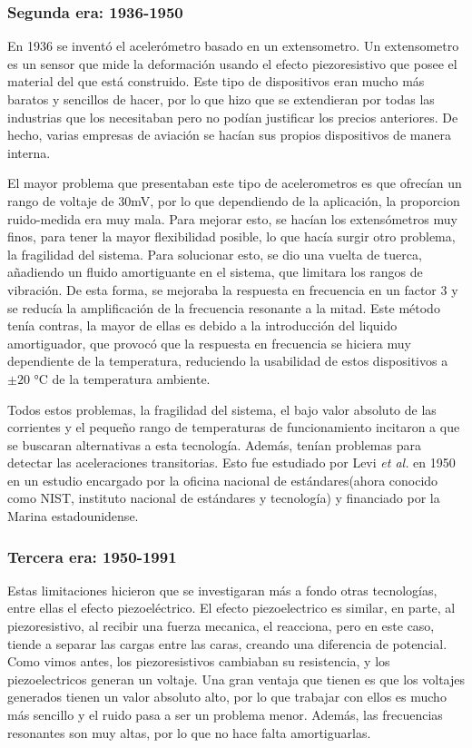 \documentclass[12pt]{article}
\numberwithin{equation}{section}
\begin{document}
{\subsubsection{Segunda era: 1936-1950}
En 1936\cite{50yearsof} se inventó el acelerómetro basado en un extensometro. Un extensometro es un sensor que mide la deformación usando el efecto piezoresistivo que posee el material del que está construido.  Este tipo de dispositivos eran mucho más baratos y sencillos de hacer, por lo que hizo que se extendieran por todas las industrias que los necesitaban pero no podían justificar los precios anteriores. De hecho, varias empresas de aviación se hacían sus propios dispositivos de manera interna.

El mayor problema que presentaban este tipo de acelerometros es que ofrecían un rango de voltaje de 30mV, por lo que dependiendo de la aplicación, la proporcion ruido-medida era muy mala. Para mejorar esto, se hacían los extensómetros muy finos, para tener la mayor flexibilidad posible, lo que hacía surgir otro problema, la fragilidad del sistema. Para solucionar esto, se dio una vuelta de tuerca, añadiendo un fluido amortiguante en el sistema, que limitara los rangos de vibración. De esta forma, se mejoraba la respuesta en frecuencia en un factor 3 y se reducía la amplificación de la frecuencia resonante a la mitad. Este método tenía contras, la mayor de ellas es debido a la introducción del liquido amortiguador, que provocó que la respuesta en frecuencia se hiciera muy dependiente de la temperatura, reduciendo la usabilidad de estos dispositivos a $\pm 20$ °C de la temperatura ambiente.

Todos estos problemas, la fragilidad del sistema, el bajo valor absoluto de las corrientes y el pequeño rango de temperaturas de funcionamiento incitaron a que se buscaran alternativas a esta tecnología. Además, tenían problemas para detectar las aceleraciones transitorias. Esto fue estudiado por Levi \textit{et al.}\cite{levy} en 1950 en un estudio encargado por la oficina nacional de estándares(ahora conocido como NIST, instituto nacional de estándares y tecnología) y financiado por la Marina estadounidense. 

\subsubsection{Tercera era: 1950-1991}

Estas limitaciones hicieron que se investigaran más a fondo otras tecnologías, entre ellas el efecto piezoeléctrico. El efecto piezoelectrico es similar, en parte, al piezoresistivo, al recibir una fuerza mecanica, el reacciona, pero  en este caso, tiende a separar las cargas entre las caras, creando una diferencia de potencial. Como vimos antes, los piezoresistivos cambiaban  su resistencia, y los piezoelectricos generan un voltaje. Una gran ventaja que tienen es que los voltajes generados tienen un valor absoluto alto, por lo que trabajar con ellos es mucho más sencillo y el ruido pasa a ser un problema menor. Además, las frecuencias resonantes son muy altas, por lo que no hace falta amortiguarlas.

}
\end{document}
